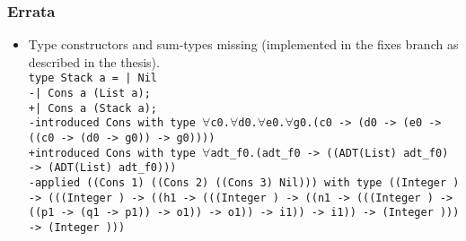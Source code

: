 \documentclass{beamer}
\begin{document}
\begin{frame}
  \frametitle{Errata}
    \begin{itemize}
      \item Type constructors and sum-types missing (implemented in the fixes branch as described in the thesis).\\
        \vspace*{0.5cm}
        \texttt{type Stack a = | Nil}\\
        \texttt{-| Cons a (List a);}\\
        \texttt{+| Cons a (Stack a);}\\
        \vspace*{0.5cm}
        \texttt{-introduced Cons with type $\forall$c0.$\forall$d0.$\forall$e0.$\forall$g0.(c0 -> (d0 -> (e0 -> ((c0 -> (d0 -> g0)) -> g0))))}\\
        \texttt{+introduced Cons with type $\forall$adt\_f0.(adt\_f0 -> ((ADT(List) adt\_f0) -> (ADT(List) adt\_f0)))}\\
        \vspace*{0.5cm}
        \texttt{-applied ((Cons 1) ((Cons 2) ((Cons 3) Nil))) with type ((Integer ) -> (((Integer ) -> ((h1 -> (((Integer ) -> ((n1 -> (((Integer ) -> ((p1 -> (q1 -> p1)) -> o1)) -> o1)) -> i1)) -> i1)) -> (Integer ))) -> (Integer )))}
    \end{itemize}
\end{frame}

\begin{frame}
    \printbibliography
\end{frame}
\end{document}
